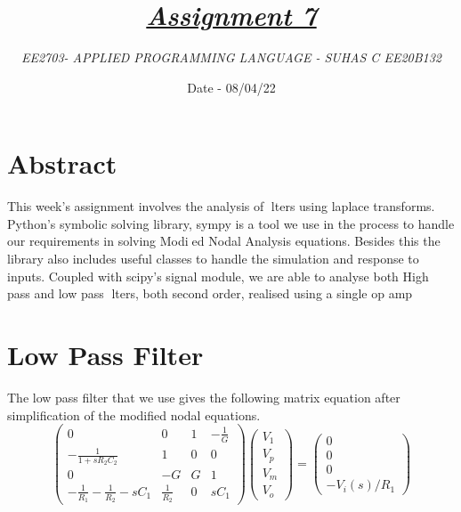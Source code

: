 \documentclass[11pt, a4paper]{article}
\title{\underline{\textit{\Large{Assignment 7}}}}
\author{\textit{ EE2703- APPLIED PROGRAMMING LANGUAGE - SUHAS C EE20B132 }}
\date{ Date - 08/04/22}
\begin{document}
\maketitle

\section*{Abstract}
This week's assignment involves the analysis of lters using laplace transforms.
Python's symbolic solving library, sympy is a tool we use in the process to
handle our requirements in solving Modied Nodal Analysis equations. Besides
this the library also includes useful classes to handle the simulation and response
to inputs.
Coupled with scipy's signal module, we are able to analyse both High pass
and low pass lters, both second order, realised using a single op amp

\section*{Low Pass Filter}
The low pass filter that we use gives the following matrix equation after simplification of the modified nodal equations.
\[\begin{pmatrix} 0 & 0 & 1 & -\frac{1}{G} \\ -\frac{1}{1+sR_2C_2} & 1 & 0 & 0 \\ 0 & -G & G & 1 \\ -\frac{1}{R_1}-\frac{1}{R_2}-sC_1 & \frac{1}{R_2} & 0 & sC_1 \end{pmatrix}\begin{pmatrix} V_1 \\ V_p \\ V_m \\ V_o \end{pmatrix} = \begin{pmatrix} 0 \\ 0 \\ 0 \\ -V_i(s)/R_1 \end{pmatrix}\]
\end{document}
